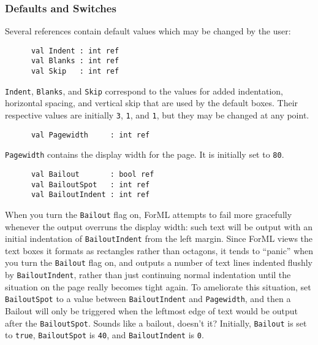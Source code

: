 \subsubsection{Defaults and Switches}
Several references contain default values which may be changed by the
user:
\begin{verbatim}
      val Indent : int ref
      val Blanks : int ref
      val Skip   : int ref
\end{verbatim}
{\tt Indent}, {\tt Blanks}, and {\tt Skip} correspond to
the values for added indentation, horizontal spacing, and vertical skip
that are used by the default boxes. Their respective values are initially
{\tt 3}, {\tt 1}, and {\tt 1}, but they may be changed at any point.
\begin{verbatim}
      val Pagewidth     : int ref
\end{verbatim}
{\tt Pagewidth} contains the display width for the page. It is initially set to
{\tt 80}.
\begin{verbatim}
      val Bailout       : bool ref
      val BailoutSpot   : int ref
      val BailoutIndent : int ref
\end{verbatim}
When you turn the {\tt Bailout} flag on, ForML attempts to fail more gracefully
whenever the output overruns the display width: such text will be output with
an initial indentation of {\tt BailoutIndent} from the left margin.
Since ForML views the text boxes it formats as rectangles rather than
octagons, it tends to ``panic'' when you turn the {\tt Bailout} flag on, and
outputs a number of text lines indented flushly by {\tt BailoutIndent},
rather than just continuing normal indentation until the situation on the page
really becomes tight again.
To ameliorate this situation, set {\tt BailoutSpot}
to a value between {\tt BailoutIndent} and {\tt Pagewidth}, and then a
Bailout will only be triggered when the leftmost edge of text would be output
after the {\tt BailoutSpot}. 
Sounds like a bailout, doesn't it?
Initially, {\tt Bailout} is set to {\tt true}, {\tt BailoutSpot} is {\tt 40},
and {\tt BailoutIndent} is {\tt 0}.

